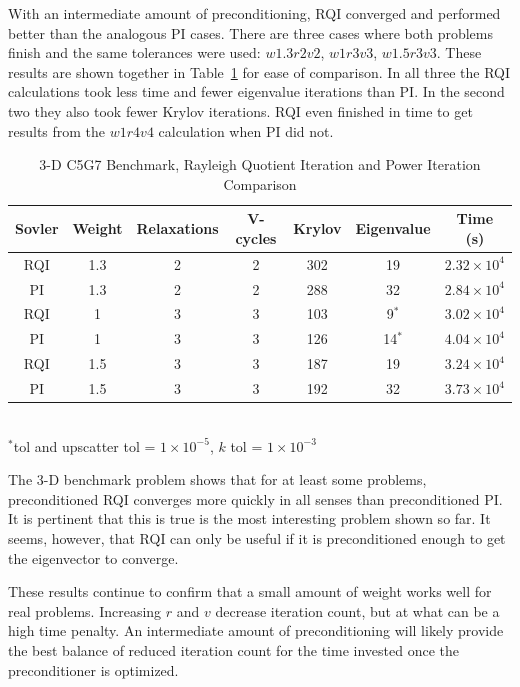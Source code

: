 With an intermediate amount of preconditioning, RQI converged and performed better than the analogous PI cases. There are three cases where both problems finish and the same tolerances were used: $w1.3r2v2$, $w1r3v3$, $w1.5r3v3$. These results are shown together in Table~\ref{table:PI RQI} for ease of comparison. In all three the RQI calculations took less time and fewer eigenvalue iterations than PI. In the second two they also took fewer Krylov iterations. RQI even finished in time to get results from the $w1r4v4$ calculation when PI did not. 
%
\begin{table}[!h]
\caption{3-D C5G7 Benchmark, Rayleigh Quotient Iteration and Power Iteration Comparison}
\begin{center}
\begin{tabular}{| c | c | c | c | c | c | c |}
\hline
Sovler & Weight & Relaxations & V-cycles & Krylov & Eigenvalue & Time (s) \\[0.5ex]
\hline
RQI & 1.3 & 2 & 2 & 302    & 19           & $2.32 \times 10^{4}$ \\
PI    & 1.3 & 2 & 2 & 288    & 32           & $2.84 \times 10^{4}$ \\
RQI & 1    & 3 & 3 & 103    & 9$^{*}$   & $3.02 \times 10^{4}$ \\
PI    & 1    & 3 & 3 & 126    & 14$^{*}$ & $4.04 \times 10^{4}$ \\
RQI & 1.5 & 3 & 3 & 187    & 19           & $3.24 \times 10^{4}$ \\
PI    & 1.5 & 3 & 3 & 192    & 32           & $3.73 \times 10^{4}$ \\
\hline 
\end{tabular}\\
$^{*}$tol and upscatter tol = $1 \times 10^{-5}$, $k$ tol = $1 \times 10^{-3}$
\end{center}
\label{table:PI RQI}
\end{table}  

The 3-D benchmark problem shows that for at least some problems, preconditioned RQI converges more quickly in all senses than preconditioned PI. It is pertinent that this is true is the most interesting problem shown so far. It seems, however, that RQI can only be useful if it is preconditioned enough to get the eigenvector to converge. 

These results continue to confirm that a small amount of weight works well for real problems. Increasing $r$ and $v$ decrease iteration count, but at what can be a high time penalty. An intermediate amount of preconditioning will likely provide the best balance of reduced iteration count for the time invested once the preconditioner is optimized. 

